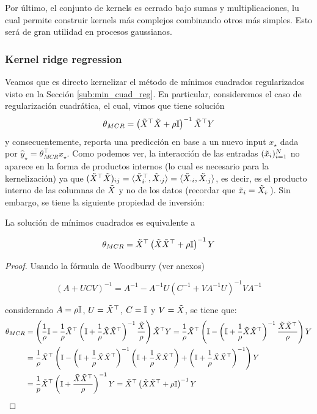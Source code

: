 Por último, el conjunto de kernels es cerrado bajo sumas y multiplicaciones, lu cual permite construir kernels más complejos combinando otros más simples. Esto será de gran utilidad en procesos gaussianos.

\subsubsection{Kernel ridge regression}

Veamos que es directo kernelizar el método de mínimos cuadrados regularizados visto en la Sección \ref{sub:min_cuad_reg}. En particular, consideremos el caso de regularización cuadrática, el cual, vimos que tiene solución
\begin{equation}
    \theta_{MCR} = \left(\tilde{X}^\top\tilde{X} +\rho {\mathbb I}\right)^{-1} \tilde{X}^\top Y
    \label{eq:RR_soln1}
\end{equation}
 y consecuentemente, reporta una predicción en base a un nuevo input $x_\star$ dada por $\hat{y}_\star = \theta_{MCR}^\top x_\star$. Como podemos ver, la interacción de las entradas $(\tilde{x}_i)_{i=1}^N$ no aparece en la forma de productos internos (lo cual es necesario para la kernelización) ya que $(\tilde{X}^\top\tilde{X})_{ij}=\langle\tilde{X}^\top_{i\cdot},\tilde{X}_{\cdot j}\rangle=\langle\tilde{X}_{\cdot i},\tilde{X}_{\cdot j}\rangle$, es decir, es el producto interno de las columnas de $\tilde{X}$ y no de los datos (recordar que $\tilde{x}_i = \tilde{X}_{i\cdot}$). Sin embargo, se tiene la siguiente propiedad de inversión:

\begin{lemma} La solución de mínimos cuadrados es equivalente a

\begin{equation}
	\theta_{MCR} = \tilde{X}^\top\left(\tilde{X}\tilde{X}^\top + \rho{\mathbb I}\right)^{-1}Y
	\label{eq:RR_soln2}
\end{equation}

\end{lemma}

\begin{proof}
	Usando la fórmula de Woodburry (ver anexos)
	
	\begin{equation}
		(A+UCV)^{-1} = A^{-1} - A^{-1}U(C^{-1}+VA^{-1}U)^{-1}VA^{-1}
	\end{equation}
	
considerando $A=\rho{\mathbb I}$, $U=\tilde{X}^\top$, $C={\mathbb I}$ y $V=\tilde{X}$, se tiene que:
\begin{align}
	\theta_{MCR} &= \left(\frac{1}{\rho}{\mathbb I}- \frac{1}{\rho}\tilde{X}^\top\left({\mathbb I}+\frac{1}{\rho}\tilde{X}\tilde{X}^\top\right)^{-1}\frac{\tilde{X}}{\rho}\right)\tilde{X}^\top Y=\frac{1}{\rho}\tilde{X}^\top \left({\mathbb I}- \left({\mathbb I}+\frac{1}{\rho}\tilde{X}\tilde{X}^\top\right)^{-1}\frac{\tilde{X}\tilde{X}^\top}{\rho}\right)Y\\
	&= \frac{1}{\rho}\tilde{X}^\top \left({\mathbb I}- \left({\mathbb I}+\frac{1}{\rho}\tilde{X}\tilde{X}^\top\right)^{-1}\left({\mathbb I}+\frac{1}{\rho}\tilde{X}\tilde{X}^\top\right) + \left({\mathbb I}+\frac{1}{\rho}\tilde{X}\tilde{X}^\top\right)^{-1}\right)Y\\
	&= \frac{1}{p}\tilde{X}^\top\left({\mathbb I}+\frac{\tilde{X}\tilde{X}^\top}{\rho}\right)^{-1}Y= \tilde{X}^\top\left(\tilde{X}\tilde{X}^\top + \rho{\mathbb I}\right)^{-1}Y
\end{align}
\end{proof}

